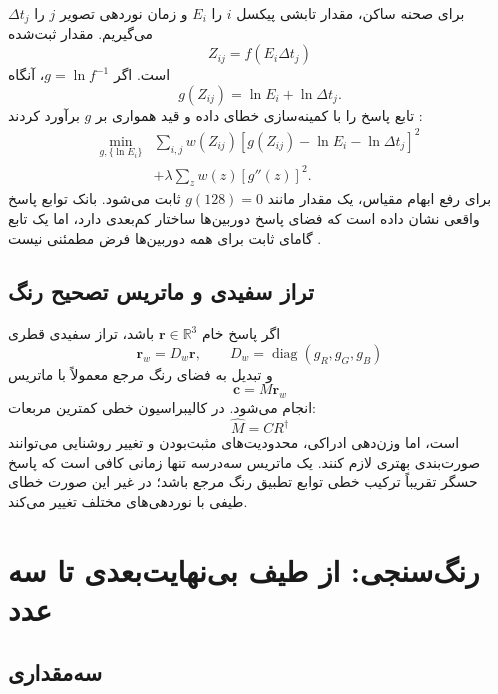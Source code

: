 \documentclass[12pt,openany,oneside]{book}
\newcommand{\R}{\mathbb{R}}
\newcommand{\vect}[1]{\bm{#1}}
\newcommand{\diag}{\operatorname{diag}}
\begin{document}
برای صحنه ساکن، مقدار تابشی پیکسل \(i\) را \(E_i\) و زمان نوردهی تصویر \(j\) را \(\Delta t_j\)
می‌گیریم. مقدار ثبت‌شده
\begin{equation}
Z_{ij}=f(E_i\Delta t_j)
\end{equation}
است. اگر \(g=\ln f^{-1}\)، آنگاه
\begin{equation}
g(Z_{ij})=\ln E_i+\ln\Delta t_j.
\label{eq:response-log}
\end{equation}
 تابع پاسخ را با کمینه‌سازی خطای داده و قید همواری بر \(g\) برآورد کردند
\cite{debevec1997hdr}:
\begin{align}
\min_{g,\{\ln E_i\}}
&\sum_{i,j}w(Z_{ij})
\left[g(Z_{ij})-\ln E_i-\ln\Delta t_j\right]^2\\
&+\lambda\sum_z w(z)\left[g''(z)\right]^2.
\label{eq:debevec-objective}
\end{align}
برای رفع ابهام مقیاس، یک مقدار مانند \(g(128)=0\) ثابت می‌شود. بانک توابع پاسخ واقعی نشان داده
است که فضای پاسخ دوربین‌ها ساختار کم‌بعدی دارد، اما یک تابع گامای ثابت برای همه دوربین‌ها فرض
مطمئنی نیست \cite{grossberg2003crf}.

\subsection{تراز سفیدی و ماتریس تصحیح رنگ}

اگر پاسخ خام \(\vect r\in\R^3\) باشد، تراز سفیدی قطری
\begin{equation}
\vect r_w=D_w\vect r,
\qquad D_w=\diag(g_R,g_G,g_B)
\end{equation}
و تبدیل به فضای رنگ مرجع معمولاً با ماتریس
\begin{equation}
\vect c=M\vect r_w
\end{equation}
انجام می‌شود. در کالیبراسیون خطی کمترین مربعات:
\begin{equation}
\widehat M= C R^{\dagger}
\end{equation}
است، اما وزن‌دهی ادراکی، محدودیت‌های مثبت‌بودن و تغییر روشنایی می‌توانند صورت‌بندی بهتری لازم کنند.
یک ماتریس سه‌درسه تنها زمانی کافی است که پاسخ حسگر تقریباً ترکیب خطی توابع تطبیق رنگ مرجع باشد؛
در غیر این صورت خطای طیفی با نوردهی‌های مختلف تغییر می‌کند.

\section{رنگ‌سنجی: از طیف بی‌نهایت‌بعدی تا سه عدد}

\subsection{سه‌مقداری }
\end{document}
